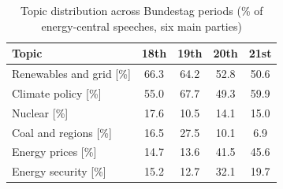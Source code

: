 \begin{table}[H]
    \centering
    \begin{tabular}{lcccc}
        \toprule
        Topic & 18th & 19th & 20th & 21st \\
        \midrule
        Renewables and grid [\%] & 66.3 & 64.2 & 52.8 & 50.6 \\
        Climate policy [\%] & 55.0 & 67.7 & 49.3 & 59.9 \\
        Nuclear [\%] & 17.6 & 10.5 & 14.1 & 15.0 \\
        Coal and regions [\%] & 16.5 & 27.5 & 10.1 & 6.9 \\
        Energy prices [\%] & 14.7 & 13.6 & 41.5 & 45.6 \\
        Energy security [\%] & 15.2 & 12.7 & 32.1 & 19.7 \\
        \bottomrule
    \end{tabular}
    \caption{Topic distribution across Bundestag periods
    (\% of energy-central speeches, six main parties)}
    \label{tab:topic_period}
\end{table}
